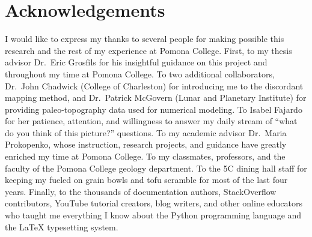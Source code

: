 \chapter*{Acknowledgements}

I would like to express my thanks to several people for making possible this research and the rest of my experience at Pomona College. First, to my thesis advisor Dr.\ Eric Grosfils for his insightful guidance on this project and throughout my time at Pomona College. To two additional collaborators, Dr.\ John Chadwick (College of Charleston) for introducing me to the discordant mapping method, and Dr.\ Patrick McGovern (Lunar and Planetary Institute) for providing paleo-topography data used for numerical modeling. To Isabel Fajardo for her patience, attention, and willingness to answer my daily stream of ``what do you think of this picture?'' questions. To my academic advisor Dr.\ Maria Prokopenko, whose instruction, research projects, and guidance have greatly enriched my time at Pomona College. To my classmates, professors, and the faculty of the Pomona College geology department. To the 5C dining hall staff for keeping my fueled on grain bowls and tofu scramble for most of the last four years. Finally, to the thousands of documentation authors, StackOverflow contributors, YouTube tutorial creators, blog writers, and other online educators who taught me everything I know about the Python programming language and the \LaTeX{} typesetting system.